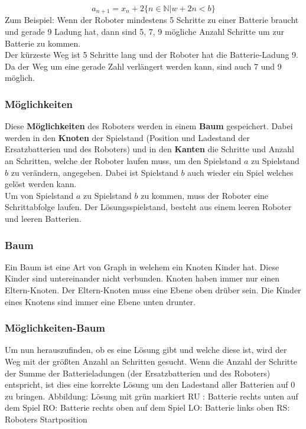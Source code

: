 \documentclass[a4paper,12pt,arial]{scrartcl}
\begin{document}
\[ a_{n+1} = x_{n} + 2  \{n \in \mathbb{N} | w + 2n < b\} \]
Zum Beispiel:
Wenn der Roboter mindestens 5 Schritte zu einer Batterie braucht und gerade 9 Ladung hat, dann sind 5, 7, 9 mögliche Anzahl Schritte um zur Batterie zu kommen.
\\
Der kürzeste Weg ist 5 Schritte lang und der Roboter hat die Batterie-Ladung 9. Da der Weg um eine gerade Zahl verlängert werden kann, sind auch 7 und 9 möglich.

\subsubsection{Möglichkeiten}

Diese \textbf{Möglichkeiten} des Roboters werden in einem \textbf{Baum} gespeichert.
Dabei werden in den \textbf{Knoten} der Spielstand (Position und Ladestand der Ersatzbatterien und des Roboters) und in den \textbf{Kanten} die Schritte und Anzahl an Schritten, welche der Roboter laufen muss, um den Spielstand $a$ zu Spielstand $b$ zu verändern, angegeben.
Dabei ist Spielstand $b$ auch wieder ein Spiel welches gelöst werden kann.
\\
Um von Spielstand $a$ zu Spielstand $b$ zu kommen, muss der Roboter eine Schrittabfolge laufen.
Der Lösungsspielstand, besteht aus einem leeren Roboter und leeren Batterien.

\par
\subsubsection{Baum}
Ein Baum ist eine Art von Graph in welchem ein Knoten Kinder hat. Diese Kinder sind untereinander nicht verbunden.
Knoten haben immer nur einen Eltern-Knoten. Der Eltern-Knoten muss eine Ebene oben drüber sein. Die Kinder eines Knotens sind immer eine Ebene unten drunter.


\subsubsection{Möglichkeiten-Baum}
Um nun herauszufinden, ob es eine Lösung gibt und welche diese ist, wird der Weg mit der größten Anzahl an Schritten gesucht. Wenn die Anzahl der Schritte der Summe der Batterieladungen (der Ersatzbatterien und des Roboters) entspricht, ist dies eine korrekte Lösung um den Ladestand aller Batterien auf 0 zu bringen.
Abbildung:
Lösung mit grün markiert
    RU : Batterie rechts unten auf dem Spiel
    RO: Batterie rechts oben auf dem Spiel
    LO: Batterie links oben
    RS: Roboters Startposition
\par
\newpage
\end{document}
